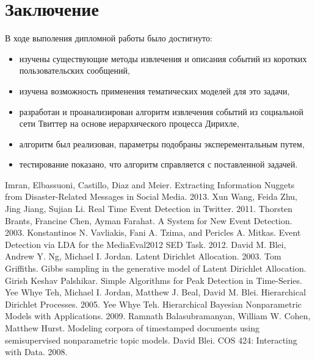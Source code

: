 \documentclass[12pt, a4paper]{article}
\begin{document}
	\section{Заключение}
	В ходе выполения дипломной работы было достигнуто:
	\begin{itemize}
	\item изучены существующие методы извлечения и описания событий из коротких пользовательских сообщений,
	\item изучена возможность применения тематических моделей для это задачи,
	\item разработан и проанализирован алгоритм извлечения событий из социальной сети Твиттер на основе иерархического процесса Дирихле,
	\item алгоритм был реализован, параметры подобраны эксперементальным путем,
	\item тестирование показано, что алгоритм справляется с поставленной задачей.
	\end{itemize}
	
  
\begin{thebibliography}{9}
	Imran, Elbassuoni, Castillo, Diaz and Meier.
	Extracting Information Nuggets from Disaster-Related Messages in Social Media.
	2013.
	Xun Wang, Feida Zhu, Jing Jiang, Sujian Li.
	Real Time Event Detection in Twitter.
	2011.
	Thorsten Brants, Francine Chen, Ayman Farahat.
	A System for New Event Detection.
	2003.
	Konstantinos N. Vavliakis, Fani A. Tzima, and Pericles A. Mitkas.	
	Event Detection via LDA for the MediaEval2012 SED Task.
	2012.
	David M. Blei, Andrew Y. Ng, Michael I. Jordan.
	Latent Dirichlet Allocation.
	2003.
	Tom Griffiths.
	Gibbs sampling in the generative model of Latent Dirichlet Allocation.
	Girish Keshav Palshikar.
	Simple Algorithms for Peak Detection in Time-Series.
	Yee Whye Teh, Michael I. Jordan, Matthew J. Beal, David M. Blei.
	Hierarchical Dirichlet Processes.
	2005.
	Yee Whye Teh.
	Hierarchical Bayesian Nonparametric Models with Applications.
	2009.
	Ramnath Balasubramanyan, William W. Cohen, Matthew Hurst.
	Modeling corpora of timestamped documents using semisupervised nonparametric topic models.
	 David Blei.
	 COS 424: Interacting with Data.
	 2008.
\end{thebibliography}
  
\end{document}
